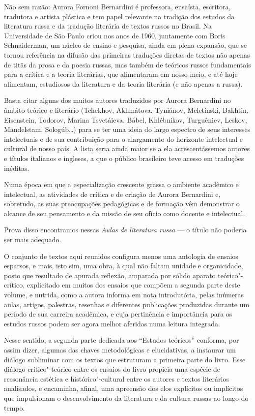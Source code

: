 Não sem razão: Aurora Fornoni Bernardini é professora, ensaísta,
escritora, tradutora e artista plástica e tem papel relevante na
tradição dos estudos da literatura russa e da tradução literária de
textos russos no Brasil. Na Universidade de São Paulo criou nos anos de
1960, juntamente com Boris Schnaiderman, um núcleo de ensino e pesquisa,
ainda em plena expansão, que se tornou referência na difusão das
primeiras traduções diretas de textos não apenas de titãs da prosa e da
poesia russas, mas também de teóricos russos fundamentais para a crítica
e a teoria literárias, que alimentaram em nosso meio, e até hoje
alimentam, estudiosos da literatura e da teoria literária (e não apenas
a russa).

Basta citar alguns dos muitos autores traduzidos por Aurora Bernardini
no âmbito teórico e literário (Tchekhov, Akhmátova, Tyniánov,
Meletínski, Bakhtin, Eisenstein, Todorov, Marina Tsvetáieva, Bábel,
Khlébnikov, Turguêniev, Leskov, Mandelstam, Sologúb\ldots{}) para se ter uma
ideia do largo espectro de seus interesses intelectuais e de sua
contribuição para o alargamento do horizonte intelectual e cultural de
nosso país. A lista seria ainda maior se a ela acrescentássemos autores
e títulos italianos e ingleses, a que o público brasileiro teve acesso
em traduções inéditas.

Numa época em que a especialização crescente grassa o ambiente acadêmico
e intelectual, as atividades de crítica e de criação de Aurora
Bernardini e, sobretudo, as suas preocupações pedagógicas e de formação
vêm demonstrar o alcance de seu pensamento e da missão de seu ofício
como docente e intelectual.

Prova disso encontramos nessas \emph{Aulas de literatura russa} --- o título
não poderia ser mais adequado.

O conjunto de textos aqui reunidos configura menos uma antologia de
ensaios esparsos, e mais, isto sim, uma obra, à qual não faltam unidade
e organicidade, posto que resultado de apurada reflexão, amparada por
sólido aparato teórico"-crítico, explicitado em muitos dos ensaios que
compõem a segunda parte deste volume, e nutrida, como a autora informa
em nota introdutória, pelas inúmeras aulas, artigos, palestras, resenhas
e diferentes publicações produzidas durante um período de sua carreira
acadêmica, e cuja pertinência e importância para os estudos russos podem
ser agora melhor aferidas numa leitura integrada.

Nesse sentido, a segunda parte dedicada aos ``Estudos teóricos''
conforma, por assim dizer, algumas das chaves metodológicas e
elucidativas, a instaurar um diálogo subliminar com os textos que
estruturam a primeira parte do livro. Esse diálogo crítico"-teórico entre
os ensaios do livro propicia uma espécie de ressonância estética e
histórico"-cultural entre os autores e textos literários analisados, e
encaminha, afinal, uma apreensão dos elos explícitos ou implícitos que
impulsionam o desenvolvimento da literatura e da cultura russas ao longo do
tempo.

